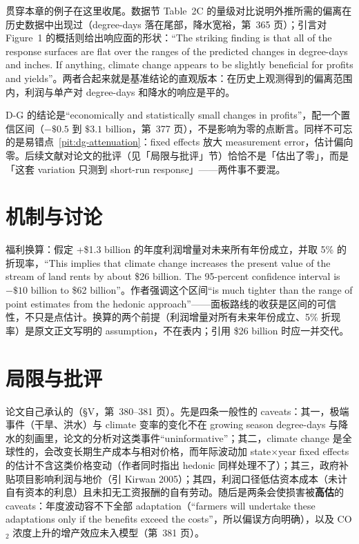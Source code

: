 贯穿本章的例子在这里收尾。数据节 Table~2C 的量级对比说明外推所需的偏离在历史数据中出现过（degree-days 落在尾部，降水宽裕，第~365 页）；引言对 Figure~1 的概括则给出响应面的形状：``The striking finding is that all of the response surfaces are flat over the ranges of the predicted changes in degree-days and inches. If anything, climate change appears to be slightly beneficial for profits and yields''\citep[第~355 页]{deschenes2007economic}。两者合起来就是基准结论的直观版本：在历史上观测得到的偏离范围内，利润与单产对 degree-days 和降水的响应是平的。

\begin{pitfall}
D-G 的结论是``economically and statistically small changes in profits''\citep[第~377 页]{deschenes2007economic}，配一个置信区间（$-\$0.5$ 到 $\$3.1$ billion，第~377 页），不是影响为零的点断言。同样不可忘的是易错点~\ref{pit:dg-attenuation}：fixed effects 放大 measurement error，估计偏向零。后续文献对论文的批评（见「局限与批评」节）恰恰不是「估出了零」，而是「这套 variation 只测到 short-run response」——两件事不要混。
\end{pitfall}

\section{机制与讨论}

福利换算：假定 +\$1.3 billion 的年度利润增量对未来所有年份成立，并取 5\% 的折现率，``This implies that climate change increases the present value of the stream of land rents by about \$26 billion. The 95-percent confidence interval is $-\$10$ billion to \$62 billion''\citep[第~380 页]{deschenes2007economic}。作者强调这个区间``is much tighter than the range of point estimates from the hedonic approach''\citep[第~380 页]{deschenes2007economic}——面板路线的收获是区间的可信性，不只是点估计。换算的两个前提（利润增量对所有未来年份成立、5\% 折现率）是原文正文写明的 assumption，不在表内；引用 \$26 billion 时应一并交代。

\section{局限与批评}

论文自己承认的（\S V，第~380--381 页）。先是四条一般性的 caveats：其一，极端事件（干旱、洪水）与 climate 变率的变化不在 growing season degree-days 与降水的刻画里，论文的分析对这类事件``uninformative''\citep[第~380 页]{deschenes2007economic}；其二，climate change 是全球性的，会改变长期生产成本与相对价格，而年际波动加 state$\times$year fixed effects 的估计不含这类价格变动（作者同时指出 hedonic 同样处理不了）；其三，政府补贴项目影响利润与地价（引 Kirwan 2005）；其四，利润口径低估资本成本（未计自有资本的利息）且未扣无工资报酬的自有劳动。随后是两条会使损害被\textbf{高估}的 caveats：年度波动容不下全部 adaptation（``farmers will undertake these adaptations only if the benefits exceed the costs''\citep[第~381 页]{deschenes2007economic}，所以偏误方向明确），以及 CO$_2$ 浓度上升的增产效应未入模型（第~381 页）。

